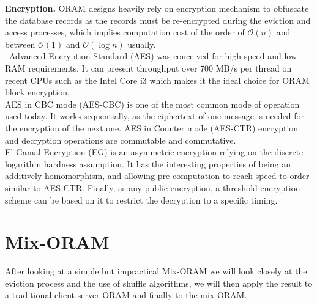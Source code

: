 \documentclass{llncs}
\begin{document}
\noindent\textbf{Encryption.}
ORAM designs heavily rely on encryption mechanism to obfuscate the database records as the records must be re-encrypted during the eviction and access processes, which implies computation cost of the order of $\mathcal{O} \left ( n \right )$ and between $\mathcal{O} \left ( 1 \right )$ and $\mathcal{O} \left ( \log n \right )$ usually.\\\
Advanced Encryption Standard (AES) was conceived for high speed and low RAM requirements. It can present throughput over 700 MB/s per thread on recent CPUs such as the Intel Core i3 which makes it the ideal choice for ORAM block encryption.\\
AES in CBC mode (AES-CBC) is one of the most common mode of operation used today. It works sequentially, as the ciphertext of one message is needed for the encryption of the next one. 
AES in Counter mode (AES-CTR) encryption and decryption operations are commutable and commutative.\\
El-Gamal Encryption (EG) is an asymmetric encryption relying on the discrete logarithm hardness assumption. It has the interesting properties of being an additively homomorphism, and allowing pre-computation to reach speed to order similar to AES-CTR. Finally, as any public encryption, a threshold encryption scheme can be based on it to restrict the decryption to a specific timing.
%
\section{Mix-ORAM}\label{Mix-ORAM}
After looking at a simple but impractical Mix-ORAM we will look closely at the eviction process and the use of shuffle algorithms, we will then apply the result to a traditional client-server ORAM and finally to the mix-ORAM.
%
\end{document}

